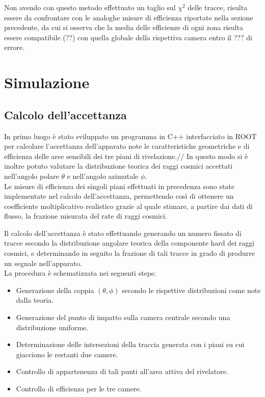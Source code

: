 \documentclass[8pt]{extarticle}
\begin{document}
Non avendo con questo metodo effettuato un taglio sul $\chi^2$ delle tracce, risulta essere da confrontare con le analoghe misure di efficienza riportate nella sezione precedente, da cui si osserva che la media delle efficienze di ogni zona risulta essere compatibile (??) con quella globale della rispettiva camera entro il ??? di errore.

\section{Simulazione}

\subsection{Calcolo dell'accettanza}
In primo luogo è stato sviluppato un programma in C++ interfacciato in ROOT per calcolare l’accettanza dell’apparato note le caratteristiche geometriche e di efficienza delle aree sensibili dei tre piani di rivelazione.//
In questo modo si è inoltre potuto valutare la distribuzione teorica dei raggi cosmici accettati nell’angolo polare $\theta$ e nell’angolo azimutale $\phi$. \\
Le misure di efficienza dei singoli piani effettuati in precedenza sono state implementate nel calcolo dell'accettanza, permettendo così di ottenere un coefficiente moltiplicativo realistico grazie al quale stimare, a partire dai dati di flusso, la frazione misurata del rate di raggi cosmici.

Il calcolo dell'accettanza è stato effettuando generando un numero fissato di tracce secondo la distribuzione angolare teorica della componente hard dei raggi cosmici, e determinando in seguito la frazione di tali tracce in grado di produrre un segnale nell'apparato.\\
La procedura è schematizzata nei seguenti steps:
\begin{itemize}
\item Generazione della coppia $(\theta, \phi)$ secondo le rispettive distribuzioni come note dalla teoria.
\item Generazione del punto di impatto sulla camera centrale secondo una distribuzione uniforme.
\item Determinazione delle intersezioni della traccia generata con i piani su cui giacciono le restanti due camere.
\item Controllo di appartenenza di tali punti all'area attiva del rivelatore.
\item Controllo di efficienza per le tre camere.
\end{itemize}
\end{document}
